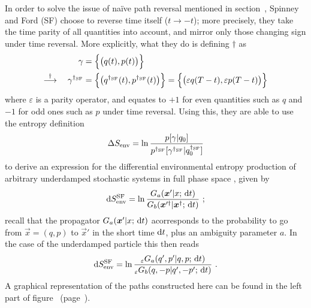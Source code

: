 In order to solve the issue of na\"ive path reversal mentioned in section~, Spinney and Ford (SF) \cite{sf} choose to reverse time itself (\(t\to-t\)); more precisely, they take the time parity of all quantities into account, and mirror only those changing sign under time reversal. More explicitly, what they do is defining \(\dagger\) as \cite{sf-odd-even}
%
\begin{equation}\begin{split}
	\gamma &= \Bigl\{\bigl(q(t),p(t)\bigr)\Bigr\}
	\\ \overset\dagger\longrightarrow \quad
	\gamma^{\dagger_{\text{SF}}}
		&= \Bigl\{\bigl(q^{\dagger_{\text{SF}}}(t),p^{\dagger_{\text{SF}}}(t)\bigr)\Bigr\}
		= \Bigl\{\bigl(\varepsilon q(T-t),\varepsilon p(T-t)\bigr)\Bigr\}
\end{split}\end{equation}
%
where \(\varepsilon\) is a parity operator, and equates to \(+1\) for even quantities such as \(q\) and \(-1\) for odd ones such as \(p\) under time reversal. Using this, they are able to use the entropy definition
%
\begin{equation}
	\Delta S_\text{env} = \ln\frac{p[\gamma | q_0]}{p^{\dagger_{\text{SF}}}[\gamma^{\dagger_{\text{SF}}} | q_0^{\dagger_{\text{SF}}}]}
\end{equation}
%
to derive an expression for the differential environmental entropy production of arbitrary underdamped stochastic systems in full phase space \cite{sf}, given by
%
\begin{equation}
	\mathrm{d}S_\text{env}^{\text{SF}} = \ln \frac{G_a(\boldsymbol{x}'|x;\,\mathrm{d} t)}{G_b(\boldsymbol{x}'^\dagger|\boldsymbol{x}^\dagger;\,\mathrm{d} t)} ~;
\end{equation}
%
recall that the propagator \(G_a(\boldsymbol{x}'|x;\,\mathrm{d} t)\) acorresponds to the probability to go from \(\vec x = (q,p)\) to \(\vec x'\) in the short time \(\mathrm{d} t\), plus an ambiguity parameter \(a\). In the case of the underdamped particle  this then reads
%
\begin{equation}
	\label{eqn:DSEnv spinney main definition}
	\mathrm{d}S_\text{env}^{\text{SF}} =
		\ln \frac
			{_\varepsilon G_a(q',p'|q,p;\,\mathrm{d} t)}
			{_\varepsilon G_b(q,-p|q',-p';\,\mathrm{d} t)} ~.
\end{equation}
%
A graphical representation of the paths constructed here can be found in the left part of figure~ (page~\pageref{fig:hf sf}).

